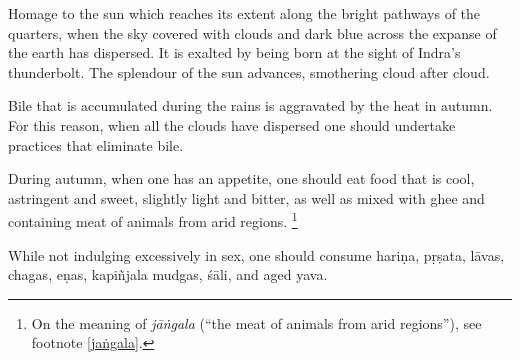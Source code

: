\begin{translation}
\item[15cd--17ab]
Homage to the sun %
which reaches its extent 
along the bright pathways of the quarters, %
when the sky covered %
with clouds and dark blue %
across the expanse of the earth has dispersed. %
It is exalted by being born at the sight of Indra’s thunderbolt. %
The splendour of the sun advances, smothering cloud after cloud.

\item[17cd--18ab]
Bile that is accumulated during the rains is aggravated by the heat in autumn. For this reason, when all the clouds have dispersed one should undertake practices that eliminate bile. 

\item[18cd--19ab]
During autumn, when one has an appetite, one should eat food that is cool, astringent and sweet, slightly light and  bitter, as well as mixed with ghee and containing meat of animals from arid regions.%
    \footnote{On the meaning of \emph{jāṅgala} (``the meat of animals from arid regions''), see footnote \ref{jaṅgala}.}

\item[19cd--20ab]
While not indulging excessively in sex, one should consume \gls{hariṇa}, %
\gls{pṛṣata}, %
\glspl{lāva}, %
\glspl{chaga}, %
\glspl{eṇa}, %
\gls{kapiñjala} %
\glspl{mudga}, %
\gls{śāli}, and aged \gls{yava}. %


\end{translation}

